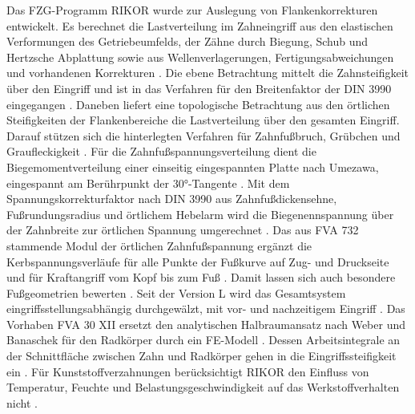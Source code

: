 Das FZG-Programm RIKOR wurde zur Auslegung von Flankenkorrekturen entwickelt. Es berechnet die Lastverteilung im Zahneingriff aus den elastischen Verformungen des Getriebeumfelds, der Zähne durch Biegung, Schub und Hertzsche Abplattung sowie aus Wellenverlagerungen, Fertigungsabweichungen und vorhandenen Korrekturen \cite[S.~1]{FVA30-XI}. Die ebene Betrachtung mittelt die Zahnsteifigkeit über den Eingriff und ist in das Verfahren für den Breitenfaktor der DIN 3990 eingegangen \cite[S.~1]{FVA30-XI}. Daneben liefert eine topologische Betrachtung aus den örtlichen Steifigkeiten der Flankenbereiche die Lastverteilung über den gesamten Eingriff. Darauf stützen sich die hinterlegten Verfahren für Zahnfußbruch, Grübchen und Graufleckigkeit \cite[S.~1 bis 3]{FVA30-XI}. Für die Zahnfußspannungsverteilung dient die Biegemomentverteilung einer einseitig eingespannten Platte nach Umezawa, eingespannt am Berührpunkt der $30$°-Tangente \cite[S.~43]{FVA30-XI}. Mit dem Spannungskorrekturfaktor nach DIN 3990 aus Zahnfußdickensehne, Fußrundungsradius und örtlichem Hebelarm wird die Biegenennspannung über der Zahnbreite zur örtlichen Spannung umgerechnet \cite[S.~43 bis 44]{FVA30-XI}. Das aus FVA 732 stammende Modul der örtlichen Zahnfußspannung ergänzt die Kerbspannungsverläufe für alle Punkte der Fußkurve auf Zug- und Druckseite und für Kraftangriff vom Kopf bis zum Fuß \cite[S.~11 bis 12]{FVA30-XI}. Damit lassen sich auch besondere Fußgeometrien bewerten \cite[S.~12]{FVA30-XI}. Seit der Version L wird das Gesamtsystem eingriffsstellungsabhängig durchgewälzt, mit vor- und nachzeitigem Eingriff \cite[S.~11 bis 12]{FVA30-XI}. Das Vorhaben FVA 30 XII ersetzt den analytischen Halbraumansatz nach Weber und Banaschek für den Radkörper durch ein FE-Modell \cite[S.~3]{FVA30-XII}. Dessen Arbeitsintegrale an der Schnittfläche zwischen Zahn und Radkörper gehen in die Eingriffssteifigkeit ein \cite[S.~3 bis 4]{FVA30-XII}. Für Kunststoffverzahnungen berücksichtigt RIKOR den Einfluss von Temperatur, Feuchte und Belastungsgeschwindigkeit auf das Werkstoffverhalten nicht \cite[S.~2]{FVA892-I}.

